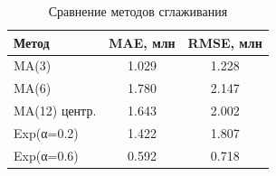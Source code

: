 \begin{table}[h!]
\centering
\caption{Сравнение методов сглаживания}
\label{tab:smooth}
\begin{tabular}{lcc}
\toprule
Метод & MAE, млн & RMSE, млн \\
\midrule
MA(3) & 1.029 & 1.228 \\
MA(6) & 1.780 & 2.147 \\
MA(12) центр. & 1.643 & 2.002 \\
Exp(α=0.2) & 1.422 & 1.807 \\
Exp(α=0.6) & 0.592 & 0.718 \\
\bottomrule
\end{tabular}
\end{table}
